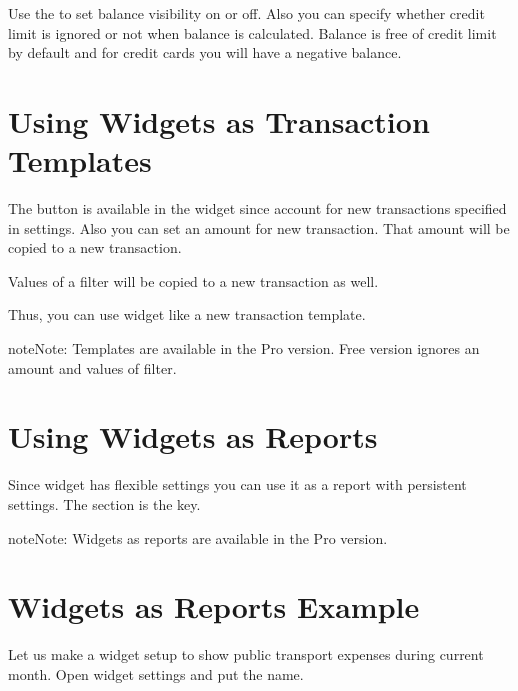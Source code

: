 \documentclass[a4paper,10pt,english]{sphinxmanual}
\begin{document}
Use the  to set balance visibility on or off. Also you can specify
whether credit limit is ignored or not when balance is calculated.
Balance is free of credit limit by default and for credit cards
you will have a negative balance.

\noindent{}
\noindent{}


\section{Using Widgets as Transaction Templates}
\label{\detokenize{widgets:using-widgets-as-transaction-templates}}
The  button is available in the widget since account for new transactions specified in
settings. Also you can set an amount for new transaction. That amount will be copied to a new transaction.

Values of a filter will be copied to a new transaction as well.

Thus, you can use widget like a new transaction template.

\begin{sphinxadmonition}{note}{Note:}
Templates are available in the Pro version. Free version ignores an amount and values of filter.
\end{sphinxadmonition}


\section{Using Widgets as Reports}
\label{\detokenize{widgets:using-widgets-as-reports}}
Since widget has flexible settings you can use it as a report with persistent settings. The
 section is the key.

\begin{sphinxadmonition}{note}{Note:}
Widgets as reports are available in the Pro version.
\end{sphinxadmonition}


\section{Widgets as Reports Example}
\label{\detokenize{widgets:widgets-as-reports-example}}
Let us make a widget setup to show public transport expenses during current month.
Open widget settings and put the  name.
\end{document}
